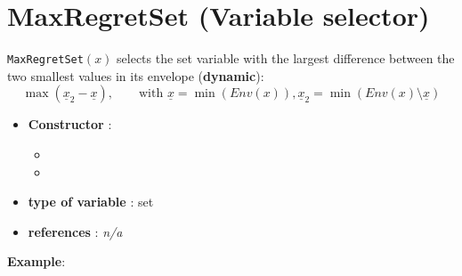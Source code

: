 \section{MaxRegretSet (Variable selector)}\label{maxregretset:maxregretsetvarselector}\hypertarget{maxregretset:maxregretsetvarselector}{}
\begin{notedef}
  \texttt{MaxRegretSet}$(x)$ selects the set variable with the largest difference between the two smallest values in its envelope (\textbf{dynamic}):
$$\max(\underline{x}_2 - \underline{x}),\qquad\text{with } \underline{x}=\min(Env(x)), \underline{x}_2=\min(Env(x)\setminus\underline{x})$$
\end{notedef}

\begin{itemize}
	\item \textbf{Constructor} : 
	\begin{itemize}
	\item {}
	\item {}
	\end{itemize}	
	\item \textbf{type of variable} : set
	\item \textbf{references} : \emph{n/a}
\end{itemize}

\textbf{Example}:
%

